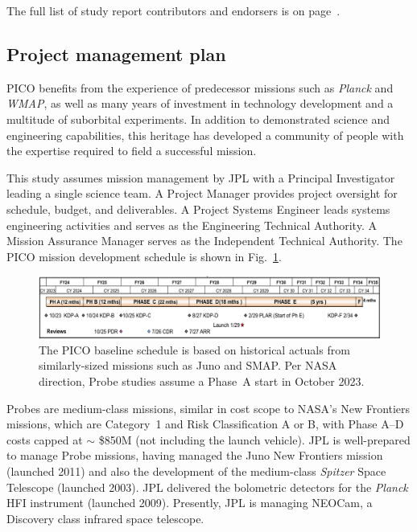 The full list of study report contributors and endorsers is on page~\pageref{authorlist}.

\subsection{Project management plan}
\label{sec:management_plan} %

PICO benefits from the experience of predecessor missions such as
\textit{Planck} and \textit{WMAP}, as well as many years of investment
in technology development and a multitude of suborbital
experiments. In addition to demonstrated science and engineering
capabilities, this heritage has developed a community of people with
the expertise required to field a successful mission.

This study assumes mission management by JPL with a Principal
Investigator leading a single science team. A Project Manager provides
project oversight for schedule, budget, and deliverables. A Project
Systems Engineer leads systems engineering activities and serves as
the Engineering Technical Authority. A Mission Assurance Manager
serves as the Independent Technical Authority. The PICO mission
development schedule is shown in Fig.~\ref{fig:Schedule}.

\begin{figure}[hb]
\begin{center}
\includegraphics[width=\textwidth]{figures/Schedule.png}
\caption{\captiontext 
  The PICO baseline schedule is based on historical actuals
  from similarly-sized missions such as Juno and
  SMAP. Per NASA direction, Probe studies assume a Phase~A start in October 2023.\label{fig:Schedule}}
\end{center}
\end{figure}

Probes are medium-class missions, similar in cost scope to NASA's
New Frontiers missions, which are Category~1 and Risk Classification A
or B, with Phase A--D costs capped at $\sim$ \$850M (not including the
launch vehicle). JPL is well-prepared to manage Probe missions, having
managed the Juno New Frontiers mission (launched 2011) and also the
development of the medium-class \textit{Spitzer} Space Telescope (launched
2003). JPL delivered the bolometric detectors for the \textit{Planck}
HFI instrument (launched 2009). Presently, JPL is managing NEOCam, a
Discovery class infrared space telescope.

